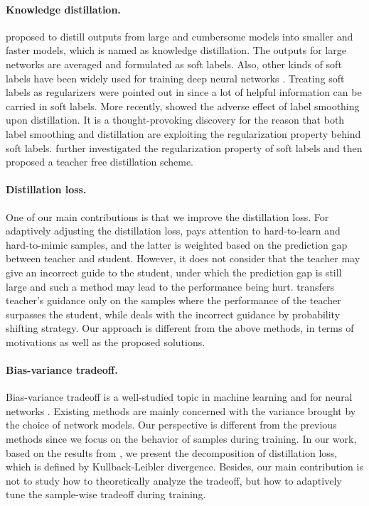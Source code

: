 \documentclass{article} \usepackage{iclr2021_conference,times}
\newcommand\revise[1]{#1}
\begin{document}
\paragraph{Knowledge distillation.} 
\citet{Hinton2015DistillingTK} proposed to distill outputs from large and cumbersome models into smaller and faster models, which is named as knowledge distillation. The outputs for large networks are averaged and formulated as soft labels. 
Also, other kinds of soft labels have been widely used for training deep neural networks \citep{szegedy2016rethinking,pereyra2017regularizing}.
Treating soft labels as regularizers were pointed out in \citep{Hinton2015DistillingTK} since a lot of helpful information can be carried in soft labels. 
More recently, \citet{muller2019does} showed the adverse effect of label smoothing upon distillation. It is a thought-provoking discovery for the reason that both label smoothing and distillation are exploiting the regularization property behind soft labels. 
\citet{yuan2020revisiting} further investigated the regularization property of soft labels and then proposed a teacher free distillation scheme. 

\paragraph{Distillation loss.} 
One of our main contributions is that we improve the distillation loss.
For adaptively adjusting the distillation loss, \citet{tang2019learning} pays attention to hard-to-learn and hard-to-mimic samples, and the latter is weighted based on the prediction gap between teacher and student. However, it does not consider that the teacher may give an incorrect guide to the student, under which the prediction gap is still large and such a method may lead to the performance being hurt. \citet{saputra2019distilling} transfers teacher's guidance only on the samples where the performance of the teacher surpasses the student, while \citet{wen2019preparing} deals with the incorrect guidance by probability shifting strategy. Our approach is different from the above methods, in terms of motivations as well as the proposed solutions.

\paragraph{Bias-variance tradeoff.} 
Bias-variance tradeoff is a well-studied topic in machine learning \citep{kohavi1996bias,domingos2000unified,valentini2004bias,bishop2006pattern} and for neural networks \citep{geman1992neural,neal2018modern,belkin2019reconciling,yang2020rethinking}. Existing methods are mainly concerned with the variance brought by the choice of network models. Our perspective is different from the previous methods since we focus on the behavior of samples during training. 
\revise{In our work, based on the results from \citet{heskes1998bias}, we present the decomposition of distillation loss, which is defined by Kullback-Leibler divergence.}
Besides, our main contribution is not to study how to theoretically analyze the tradeoff, but how to adaptively tune the sample-wise tradeoff during training.
\end{document}
